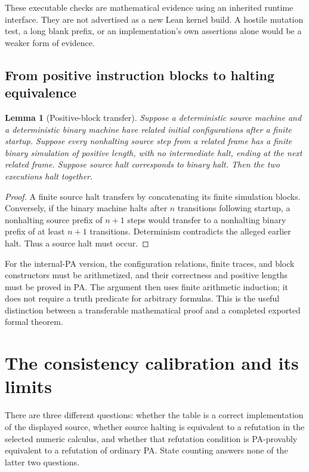 \documentclass[11pt,letterpaper]{article}
\newtheorem{lemma}{Lemma}[section]
\begin{document}
These executable checks are mathematical evidence using an inherited
runtime interface. They are not advertised as a new Lean kernel build.
A hostile mutation test, a long blank prefix, or an implementation's own
assertions alone would be a weaker form of evidence.

\subsection{From positive instruction blocks to halting equivalence}

\begin{lemma}[Positive-block transfer]\label{lem:block}
Suppose a deterministic source machine and a deterministic binary machine
have related initial configurations after a finite startup. Suppose every
nonhalting source step from a related frame has a finite binary simulation
of positive length, with no intermediate halt, ending at the next related
frame. Suppose source halt corresponds to binary halt. Then the two
executions halt together.
\end{lemma}
\begin{proof}
A finite source halt transfers by concatenating its finite simulation
blocks. Conversely, if the binary machine halts after $n$ transitions
following startup, a nonhalting source prefix of $n+1$ steps would transfer
to a nonhalting binary prefix of at least $n+1$ transitions. Determinism
contradicts the alleged earlier halt. Thus a source halt must occur.
\end{proof}

For the internal-PA version, the configuration relations, finite traces,
and block constructors must be arithmetized, and their correctness and
positive lengths must be proved in PA. The argument then uses finite
arithmetic induction; it does not require a truth predicate for arbitrary
formulas. This is the useful distinction between a transferable
mathematical proof and a completed exported formal theorem.

\section{The consistency calibration and its limits}

There are three different questions: whether the table is a correct
implementation of the displayed source, whether source halting is
equivalent to a refutation in the selected numeric calculus, and whether
that refutation condition is PA-provably equivalent to a refutation of
ordinary PA. State counting answers none of the latter two questions.
\end{document}
